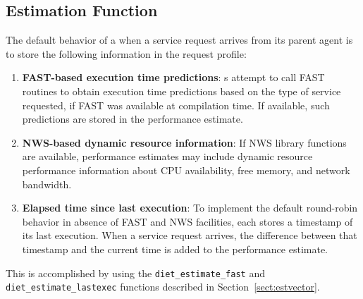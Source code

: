 \subsection{Estimation Function}\label{sect:est_fn}

The default behavior of a {\sed} when a service request arrives from
its parent agent is to store the following information in the
request profile:
\begin{enumerate}
\item \textbf{FAST-based execution time predictions}: \diet {\sed}s
  attempt to call FAST
  routines to obtain execution time predictions based on the type of
  service requested, if FAST was available at compilation time.  If
  available, such predictions are stored in the
  performance estimate.
\item \textbf{NWS-based dynamic resource information}: If NWS library
  functions are available, performance estimates may include dynamic
  resource performance information about CPU availability, free
  memory, and network bandwidth.
\item \textbf{Elapsed time since last execution}: To implement the
  default round-robin behavior in absence of FAST and NWS facilities,
  each {\sed} stores a timestamp of its last execution.  When a service
  request arrives, the difference between that timestamp and the
  current time is added to the performance estimate.
\end{enumerate}
This is accomplished by using the \texttt{diet\_estimate\_fast} and
\texttt{diet\_estimate\_lastexec} functions described in
Section~\ref{sect:estvector}.

